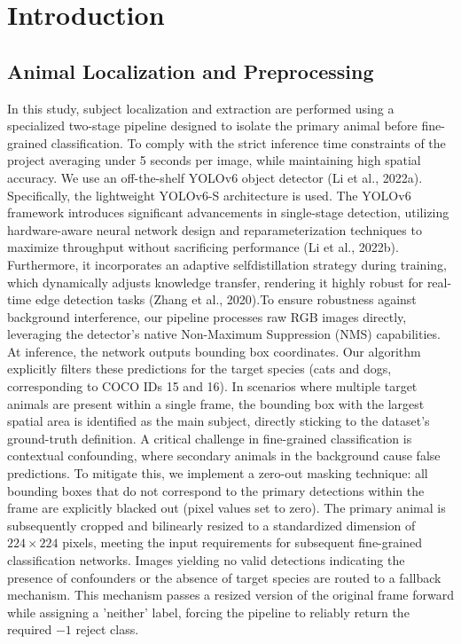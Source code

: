 \section{Introduction}
\label{sec:intro}


\subsection{Animal Localization and Preprocessing}
In this study, subject localization and extraction are performed using a specialized two-stage pipeline designed to isolate the primary animal before fine-grained classification. 
To comply with the strict inference time constraints of the project averaging under 5 seconds per image, while maintaining high spatial accuracy. 
We use an off-the-shelf YOLOv6 object detector (Li et al., 2022a). Specifically, the lightweight YOLOv6-S architecture is used. The YOLOv6 framework introduces significant advancements in 
single-stage detection, utilizing hardware-aware neural network design and reparameterization techniques to maximize throughput without sacrificing performance (Li et al., 2022b). 
Furthermore, it incorporates an adaptive selfdistillation strategy during training, which dynamically adjusts knowledge transfer, rendering it highly robust for real-time edge detection tasks 
(Zhang et al., 2020).To ensure robustness against background interference, our pipeline processes raw RGB images directly, leveraging the detector's native Non-Maximum Suppression (NMS) capabilities. 
At inference, the network outputs bounding box coordinates. Our algorithm explicitly filters these predictions for the target species (cats and dogs, corresponding to COCO IDs 15 and 16). 
In scenarios where multiple target animals are present within a single frame, the bounding box with the largest spatial area is identified as the main subject, directly sticking to the dataset's 
ground-truth definition. A critical challenge in fine-grained classification is contextual confounding, where secondary animals in the background cause false predictions. To mitigate this, we 
implement a zero-out masking technique: all bounding boxes that do not correspond to the primary detections within the frame are explicitly blacked out (pixel values set to zero). 
The primary animal is subsequently cropped and bilinearly resized to a standardized dimension of $224 \times 224$ pixels, meeting the input requirements for subsequent fine-grained 
classification networks. Images yielding no valid detections indicating the presence of confounders or the absence of target species are routed to a fallback mechanism. 
This mechanism passes a resized version of the original frame forward while assigning a 'neither' label, forcing the pipeline to reliably return the required $-1$ reject class.

